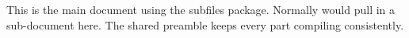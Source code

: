 \documentclass{article}
\begin{document}
This is the main document using the subfiles package.
Normally \verb|| would pull in a sub-document here.
The shared preamble keeps every part compiling consistently.
\end{document}
